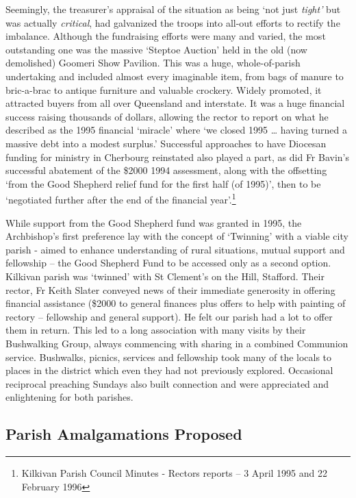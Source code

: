 Seemingly, the treasurer's appraisal of the situation as being `not just \emph{tight'} but was actually \emph{critical}, had galvanized the troops into all-out efforts to rectify the imbalance. Although the fundraising efforts were many and varied, the most outstanding one was the massive `Steptoe Auction' held in the old (now demolished) Goomeri Show Pavilion. This was a huge, whole-of-parish undertaking and included almost every imaginable item, from bags of manure to bric-a-brac to antique furniture and valuable crockery. Widely promoted, it attracted buyers from all over Queensland and interstate. It was a huge financial success raising thousands of dollars, allowing the rector to report on what he described as the 1995 financial `miracle' where `we closed 1995 \ldots{} having turned a massive debt into a modest surplus.' Successful approaches to have Diocesan funding for ministry in Cherbourg reinstated also played a part, as did Fr Bavin's successful abatement of the \$2000 1994 assessment, along with the offsetting `from the Good Shepherd relief fund for the first half (of 1995)', then to be `negotiated further after the end of the financial year'.\footnote{Kilkivan Parish Council Minutes - Rectors reports -- 3 April 1995 and 22 February 1996}

While support from the Good Shepherd fund was granted in 1995, the Archbishop's first preference lay with the concept of `Twinning' with a viable city parish - aimed to enhance understanding of rural situations, mutual support and fellowship -- the Good Shepherd Fund to be accessed only as a second option. Kilkivan parish was `twinned' with St Clement's on the Hill, Stafford. Their rector, Fr Keith Slater conveyed news of their immediate generosity in offering financial assistance (\$2000 to general finances plus offers to help with painting of rectory -- fellowship and general support). He felt our parish had a lot to offer them in return. This led to a long association with many visits by their Bushwalking Group, always commencing with sharing in a combined Communion service. Bushwalks, picnics, services and fellowship took many of the locals to places in the district which even they had not previously explored. Occasional reciprocal preaching Sundays also built connection and were appreciated and enlightening for both parishes.

\hypertarget{parish-amalgamations-proposed}{%
\subsection{Parish Amalgamations Proposed}\label{parish-amalgamations-proposed}}

